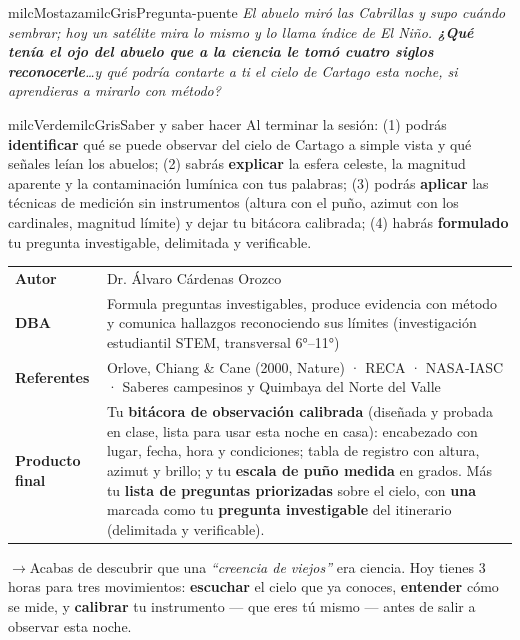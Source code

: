 \documentclass[11pt,letterpaper]{article}
\newcommand{\puente}[1]{%
  \begin{puentebox}%
    \textcolor{milcGradeDark}{$\rightarrow$}\hspace{2mm}#1%
  \end{puentebox}%
}
\begin{document}
\begin{softbox}{milcMostaza}{milcGris}{Pregunta-puente}
\textit{El abuelo miró las Cabrillas y supo cuándo sembrar; hoy un satélite mira lo mismo y lo llama \emph{índice de El Niño}. \textbf{¿Qué tenía el ojo del abuelo que a la ciencia le tomó cuatro siglos reconocerle}\ldots y qué podría contarte a ti el cielo de Cartago esta noche, si aprendieras a mirarlo con método?}
\end{softbox}

\begin{softbox}{milcVerde}{milcGris}{Saber y saber hacer}
Al terminar la sesión: (1) podrás \textbf{identificar} qué se puede observar del cielo de Cartago a simple vista y qué señales leían los abuelos; (2) sabrás \textbf{explicar} la esfera celeste, la magnitud aparente y la contaminación lumínica con tus palabras; (3) podrás \textbf{aplicar} las técnicas de medición sin instrumentos (altura con el puño, azimut con los cardinales, magnitud límite) y dejar tu bitácora calibrada; (4) habrás \textbf{formulado} tu pregunta investigable, delimitada y verificable.
\end{softbox}



\small
\begin{tabularx}{\textwidth}{>{\bfseries}p{3.0cm}Y}
Autor & Dr. Álvaro Cárdenas Orozco\\
DBA & Formula preguntas investigables, produce evidencia con método y comunica hallazgos reconociendo sus límites (investigación estudiantil STEM, transversal 6°--11°)\\
Referentes & Orlove, Chiang \& Cane (2000, Nature) · RECA · NASA-IASC · Saberes campesinos y Quimbaya del Norte del Valle\\
Producto final & Tu \textbf{bitácora de observación calibrada} (diseñada y probada en clase, lista para usar esta noche en casa): encabezado con lugar, fecha, hora y condiciones; tabla de registro con altura, azimut y brillo; y tu \textbf{escala de puño medida} en grados. Más tu \textbf{lista de preguntas priorizadas} sobre el cielo, con \textbf{una} marcada como tu \textbf{pregunta investigable} del itinerario (delimitada y verificable).\\
\end{tabularx}
\normalsize

\puente{Acabas de descubrir que una \emph{``creencia de viejos''} era ciencia. Hoy tienes 3 horas para tres movimientos: \textbf{escuchar} el cielo que ya conoces, \textbf{entender} cómo se mide, y \textbf{calibrar} tu instrumento --- que eres tú mismo --- antes de salir a observar esta noche.}
\end{document}
